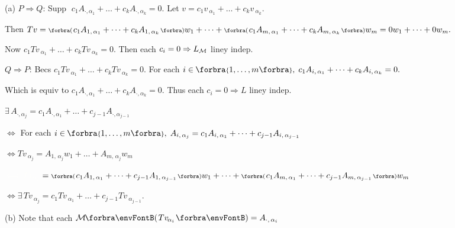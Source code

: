 (a) $P\Rightarrow Q:$\,\;Supp $\;c_1A_{\cdot,{\alpha_1}}+\dots+c_kA_{\cdot,{\alpha_k}}=0.$ \;Let $v=c_1v_{\:\!\!\alpha_1}+\dots+c_kv_{\:\!\!\alpha_k}.$\par\quad\Ha
{}Then $Tv=\BigPar{c_1A_{1,\,{\alpha_1}}+\dots+c_kA_{1,\,{\alpha_k}}}w_1+\dots+\BigPar{c_1A_{m,\,{\alpha_1}}+\dots+c_kA_{m,\,{\alpha_k}}}w_m=0w_1+\dots+0w_m.$\par\quad\Ha
{}Now $c_1Tv_{\:\!\!\alpha_1}+\dots+c_kTv_{\:\!\!\alpha_k}=0.$ Then each $c_i=0\Rightarrow L_{\mathcal{M}}$ liney indep.\vspace{4pt}\par\quad\Ha
$Q\Rightarrow P:$\,\;Becs $c_1Tv_{\:\!\!\alpha_1}+\dots+c_kTv_{\:\!\!\alpha_k}=0.$ For each $i\in\;\!\!\Bra{1,\dots,m},\;c_1A_{i,\,{\alpha_1}}+\dots+c_kA_{i,\,{\alpha_k}}=0.$\par\quad\Ha
{}Which is equiv to $c_1A_{\cdot,{\alpha_1}}+\dots+c_kA_{\cdot,{\alpha_k}}=0.$ \;Thus each $c_i=0\Rightarrow L$ liney indep.\par\vspace{4pt}\quad\Ha
\Or\;$\exists\,A_{\cdot,{\alpha_j}}=c_1A_{\cdot,{\alpha_1}}+\dots+c_{j-1}A_{\cdot,{\alpha_{j-1}}}$\par\quad\Ha
\Blind{\Or\;}$\Longleftrightarrow$ For each $i\in\;\!\!\Bra{1,\dots,m},\;A_{i,\,{\alpha_j}}=c_1A_{i,\,{\alpha_1}}+\dots+c_{j-1}A_{i,\,{\alpha_{j-1}}}$\par\quad\Ha
\Blind{\Or\;}$\Longleftrightarrow Tv_{\:\!\!\alpha_j}=A_{1,\,{\alpha_j}}w_1+\dots+A_{m,\,{\alpha_j}}w_m$\par\vspace{2pt}\quad\Ha
\Blind{\Or\;}$\Blind{\Longleftrightarrow Tv_{\:\!\!\alpha_j}}=\BigPar{c_1A_{1,\,{\alpha_1}}+\dots+c_{j-1}A_{1,\,{\alpha_{j-1}}}}w_1+\dots+\BigPar{c_1A_{m,\,{\alpha_1}}+\dots+c_{j-1}A_{m,\,{\alpha_{j-1}}}}w_m$\par\vspace{2pt}\quad\Ha
\Blind{\Or\;}$\Longleftrightarrow\exists\,Tv_{\:\!\!\alpha_j}=c_1Tv_{\:\!\!\alpha_1}+\dots+c_{j-1}Tv_{\:\!\!\alpha_{j-1}}.$\par\vspace{6pt}\quad
(b) Note that each $\Mt{Tv_{\:\!\!\alpha_i}}=A_{\cdot,\,\alpha_i}$\par\quad\Hb

